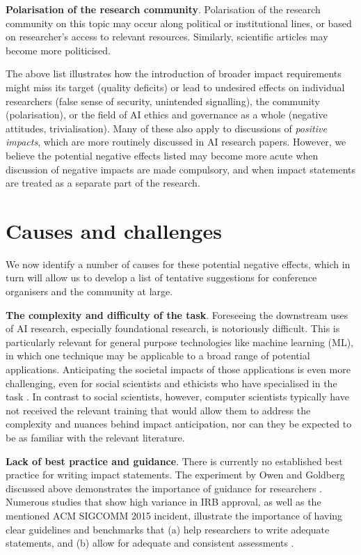 \documentclass[11pt,english]{article}
\begin{document}
	\textbf{Polarisation of the research community}. Polarisation of the research community on this topic may occur along political or institutional lines, or based on researcher's access to relevant resources. Similarly, scientific articles may become more politicised. 
	
	The above list illustrates how the introduction of broader impact requirements might miss its target (quality deficits) or lead to undesired effects on individual researchers (false sense of security, unintended signalling), the community (polarisation), or the field of AI ethics and governance as a whole (negative attitudes, trivialisation). Many of these also apply to discussions of \textit{positive impacts}, which are more routinely discussed in AI research papers. However, we believe the potential negative effects listed may become more acute when discussion of negative impacts are made compulsory, and when impact statements are treated as a separate part of the research.
	
	
	\section*{Causes and challenges}
	
	We now identify a number of causes for these potential negative effects, which in turn will allow us to develop a list of tentative suggestions for conference organisers and the community at large.
	
	
	
	\textbf{The complexity and difficulty of the task}. Foreseeing the downstream uses of AI research, especially foundational research, is notoriously difficult. This is particularly relevant for general purpose technologies like machine learning (ML), in which one technique may be applicable to a broad range of potential applications. Anticipating the societal impacts of those applications is even more challenging, even for social scientists and ethicists
	who have specialised in the task \citep{holbrook_peer_2011,european_commission_assessing_2005,spaapen_introducing_2011}. In contrast to social scientists, however, computer scientists typically have not received the relevant training that would allow them to address the complexity and nuances behind impact anticipation, nor can they be expected to be as familiar with the relevant literature.     
	
	\textbf{Lack of best practice and guidance}. There is currently no established best practice for writing impact statements. The experiment by Owen and Goldberg discussed above demonstrates the importance of guidance for researchers \citep{owen_responsible_2010}. Numerous studies that show high variance in IRB approval, as well as the mentioned ACM SIGCOMM 2015 incident, illustrate the importance of having clear guidelines and benchmarks that (a) help researchers to write adequate statements, and (b) allow for adequate and consistent assessments \citep{dziak_variations_2005,larson_survey_2004,shah_how_2004,mcwilliams_problematic_2003}. 
	
\end{document}
